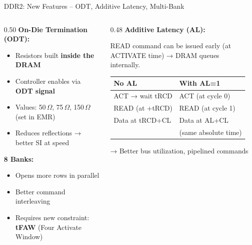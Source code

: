 \documentclass[aspectratio=169]{beamer}
\begin{document}
\begin{frame}{DDR2: New Features – ODT, Additive Latency, Multi-Bank}
  \begin{columns}[T]
    \begin{column}{0.50\textwidth}
      \textbf{On-Die Termination (ODT):}
      \begin{itemize}
        \setlength\itemsep{5pt}
        \item Resistors built \textbf{inside the DRAM}
        \item Controller enables via \textbf{ODT signal}
        \item Values: 50\,$\Omega$, 75\,$\Omega$, 150\,$\Omega$ (set in EMR)
        \item Reduces reflections → better SI at speed
      \end{itemize}
      
      \vspace{0.3cm}
      \textbf{8 Banks:}
      \begin{itemize}
        \setlength\itemsep{5pt}
        \item Opens more rows in parallel
        \item Better command interleaving
        \item Requires new constraint: \textbf{tFAW} (Four Activate Window)
      \end{itemize}
    \end{column}
    \begin{column}{0.48\textwidth}
      \vspace{0.2cm}
      \textbf{Additive Latency (AL):}
      \vspace{0.15cm}
      
      READ command can be issued early (at ACTIVATE time) → DRAM queues internally.
      
      \vspace{0.3cm}
      \small
      \begin{tabular}{l l}
        \toprule
        \textbf{No AL} & \textbf{With AL=1} \\
        \midrule
        ACT → wait tRCD & ACT (at cycle 0) \\
        READ (at +tRCD) & READ (at cycle 1) \\
        Data at tRCD+CL & Data at AL+CL \\
        & (same absolute time) \\
        \bottomrule
      \end{tabular}
      
      \vspace{0.25cm}
      → Better bus utilization, pipelined commands
    \end{column}
  \end{columns}
\end{frame}
\end{document}
